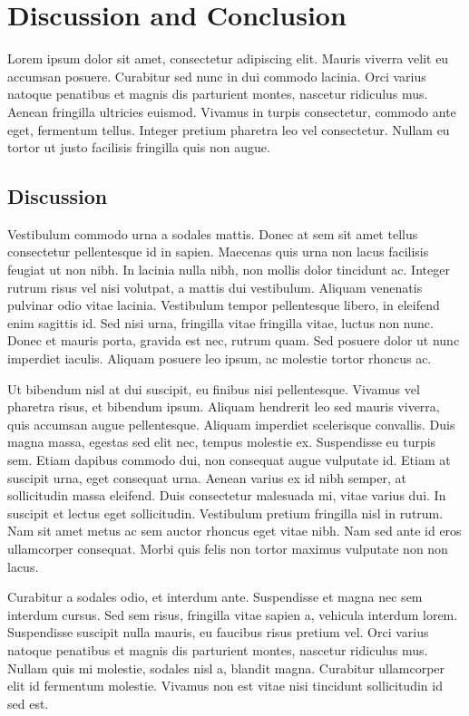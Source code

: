 \chapter{Discussion and Conclusion}

Lorem ipsum dolor sit amet, consectetur adipiscing elit. Mauris viverra velit eu accumsan posuere. Curabitur sed nunc in dui commodo lacinia. Orci varius natoque penatibus et magnis dis parturient montes, nascetur ridiculus mus. Aenean fringilla ultricies euismod. Vivamus in turpis consectetur, commodo ante eget, fermentum tellus. Integer pretium pharetra leo vel consectetur. Nullam eu tortor ut justo facilisis fringilla quis non augue.

\section{Discussion}

Vestibulum commodo urna a sodales mattis. Donec at sem sit amet tellus consectetur pellentesque id in sapien. Maecenas quis urna non lacus facilisis feugiat ut non nibh. In lacinia nulla nibh, non mollis dolor tincidunt ac. Integer rutrum risus vel nisi volutpat, a mattis dui vestibulum. Aliquam venenatis pulvinar odio vitae lacinia. Vestibulum tempor pellentesque libero, in eleifend enim sagittis id. Sed nisi urna, fringilla vitae fringilla vitae, luctus non nunc. Donec et mauris porta, gravida est nec, rutrum quam. Sed posuere dolor ut nunc imperdiet iaculis. Aliquam posuere leo ipsum, ac molestie tortor rhoncus ac.

Ut bibendum nisl at dui suscipit, eu finibus nisi pellentesque. Vivamus vel pharetra risus, et bibendum ipsum. Aliquam hendrerit leo sed mauris viverra, quis accumsan augue pellentesque. Aliquam imperdiet scelerisque convallis. Duis magna massa, egestas sed elit nec, tempus molestie ex. Suspendisse eu turpis sem. Etiam dapibus commodo dui, non consequat augue vulputate id. Etiam at suscipit urna, eget consequat urna. Aenean varius ex id nibh semper, at sollicitudin massa eleifend. Duis consectetur malesuada mi, vitae varius dui. In suscipit et lectus eget sollicitudin. Vestibulum pretium fringilla nisl in rutrum. Nam sit amet metus ac sem auctor rhoncus eget vitae nibh. Nam sed ante id eros ullamcorper consequat. Morbi quis felis non tortor maximus vulputate non non lacus.

Curabitur a sodales odio, et interdum ante. Suspendisse et magna nec sem interdum cursus. Sed sem risus, fringilla vitae sapien a, vehicula interdum lorem. Suspendisse suscipit nulla mauris, eu faucibus risus pretium vel. Orci varius natoque penatibus et magnis dis parturient montes, nascetur ridiculus mus. Nullam quis mi molestie, sodales nisl a, blandit magna. Curabitur ullamcorper elit id fermentum molestie. Vivamus non est vitae nisi tincidunt sollicitudin id sed est.

